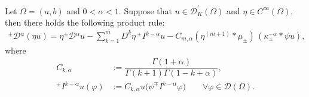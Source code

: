 \documentclass[leqno,final]{siamltex}
\numberwithin{equation}{section}
\renewcommand{\(}{\bigl(}
\renewcommand{\)}{\bigr)}
\begin{document}
 
    \begin{proposition}
        Let $\Omega = (a,b)$ and $0<\alpha<1$. Suppose that $ u \in \mathscr{D}^\prime_K(\Omega)$ and $\eta \in C^{\infty}(\Omega)$, 
        then there holds the following product rule: 
        \begin{align}\label{product_rule_dist}
         {^{\pm}}{\mathcal{D}}{^{\alpha}} (\eta u) 
         = \eta {^{\pm}}{\mathcal{D}}{^{\alpha}} u -  \sum_{k=1}^{m} D^k \eta \, {^{\pm}}{I}{^{k-\alpha}} u
         - C_{m,\alpha}  (\eta^{(m+1)} * \mu_{\pm}) \,  (\kappa_{\pm}^{-\alpha} *\psi u),
        \end{align}
        where
        \begin{align} \label{C_kalpha}
        C_{k,\alpha} &:= \dfrac{\Gamma(1+\alpha)}{\Gamma(k+1) \Gamma(1-k + \alpha)},\\
        {^{\pm}}{I}{^{k-\alpha}} u (\varphi) &:= C_{k,\alpha} u\bigl(\psi {^{\mp}}{I}{^{k-\alpha}} \varphi \bigr)
        \qquad \forall \varphi\in \mathscr{D}(\Omega). \label{fractional_int_dist}
        \end{align}
       
    \end{proposition}
\end{document}

